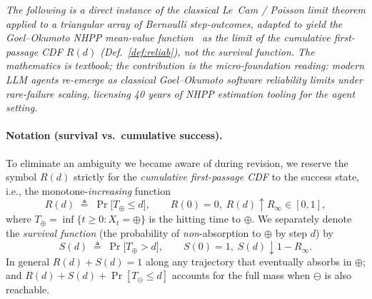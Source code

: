 
\noindent\emph{The following is a direct instance of the classical
Le~Cam / Poisson limit theorem applied to a triangular array of
Bernoulli step-outcomes, adapted to yield the Goel--Okumoto NHPP
mean-value function~\cite{goelokt} as the limit of the
\emph{cumulative first-passage CDF} $R(d)$ (Def.~\ref{def:reliab}),
not the survival function. The mathematics is textbook; the
contribution is the \emph{micro-foundation} reading: modern LLM agents
re-emerge as classical Goel--Okumoto software reliability limits under
rare-failure scaling, licensing 40 years of NHPP estimation tooling for
the agent setting.}

\paragraph{Notation (survival vs.\ cumulative success).}
To eliminate an ambiguity we became aware of during revision, we
reserve the symbol $R(d)$ strictly for the \emph{cumulative
first-passage CDF} to the success state, i.e., the
monotone-\emph{increasing} function
\begin{equation}
R(d) \;\triangleq\; \Pr\!\bigl[T_\oplus \le d\bigr], \qquad R(0)=0,\;
R(d)\uparrow R_\infty \in [0,1],
\label{eq:R-def}
\end{equation}
where $T_\oplus = \inf\{t\ge 0: X_t=\oplus\}$ is the hitting time to
$\oplus$. We separately denote the \emph{survival function} (the
probability of \emph{non}-absorption to $\oplus$ by step $d$) by
\begin{equation}
S(d) \;\triangleq\; \Pr\!\bigl[T_\oplus > d\bigr],
\qquad S(0)=1,\; S(d)\downarrow 1-R_\infty.
\label{eq:S-def}
\end{equation}
In general $R(d)+S(d)=1$ along any trajectory that eventually absorbs
in $\oplus$; and $R(d)+S(d)+\Pr[T_\ominus\le d]$ accounts for the full
mass when $\ominus$ is also reachable.


